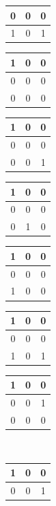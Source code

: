 \begin{center}
\begin{tabular}{|c|c|c|}
     0&0&0\\\hline
     1&0&1\\\hline
\end{tabular}\hspace{0.3cm}
\begin{tabular}{|c|c|c|}
     \hline
     1&0&0\\\hline
     0&0&0\\\hline
     0&0&0\\\hline
\end{tabular}\hspace{0.3cm}
\begin{tabular}{|c|c|c|}
     \hline
     1&0&0\\\hline
     0&0&0\\\hline
     0&0&1\\\hline
\end{tabular}\hspace{0.3cm}
\begin{tabular}{|c|c|c|}
     \hline
     1&0&0\\\hline
     0&0&0\\\hline
     0&1&0\\\hline
\end{tabular}\hspace{0.3cm}
\begin{tabular}{|c|c|c|}
     \hline
     1&0&0\\\hline
     0&0&0\\\hline
     1&0&0\\\hline
\end{tabular}\hspace{0.3cm}
\begin{tabular}{|c|c|c|}
     \hline
     1&0&0\\\hline
     0&0&0\\\hline
     1&0&1\\\hline
\end{tabular}\hspace{0.3cm}
\begin{tabular}{|c|c|c|}
     \hline
     1&0&0\\\hline
     0&0&1\\\hline
     0&0&0\\\hline
\end{tabular}\\\vspace{0.3cm}
\begin{tabular}{|c|c|c|}
     \hline
     1&0&0\\\hline
     0&0&1\\\hline

\end{tabular}
\end{center}
